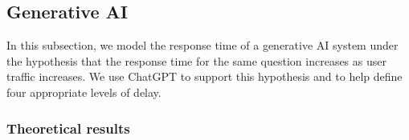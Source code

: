 \documentclass[pdflatex,sn-mathphys-ay]{sn-jnl}
\theoremstyle{thmstyleone}%
\theoremstyle{thmstyletwo}%
\theoremstyle{thmstylethree}%
\begin{document}
		
		
		

			

		
		\subsection{Generative AI} 

       In this subsection, we model the response time of a generative AI system under the hypothesis that the response time for the same question increases as user traffic increases. We use ChatGPT to support this hypothesis and to help define four appropriate levels of delay.
		\subsubsection{Theoretical results}
\end{document}
